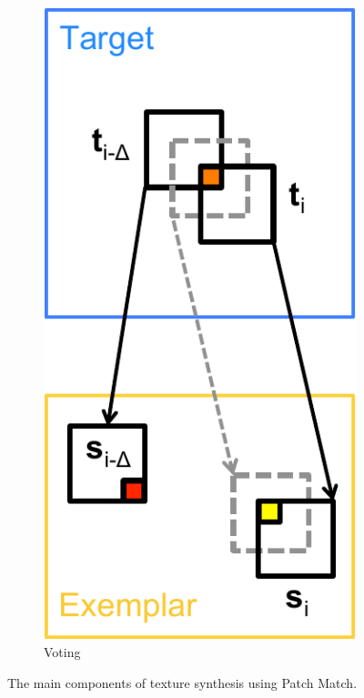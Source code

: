 \begin{figure}[h]
	\begin{subfigure}[t]{0.155\textwidth}
		\includegraphics[width=\textwidth]{figures/voting_text}
		\caption{Voting}
	\end{subfigure}
   \caption{The main components of texture synthesis using Patch Match.}
\label{fig:texsynth_patchmatch}
\end{figure}

